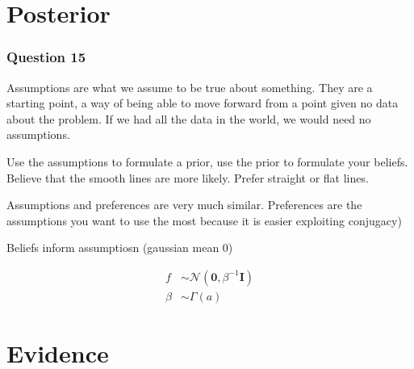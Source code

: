 \documentclass[10pt, a4paper, twocolumn]{article} %
\begin{document}
\section{Posterior}

\subsubsection*{Question 15}

Assumptions are what we assume to be true about something. They are a starting point, a way of being able to move forward from a point given no data about the problem. If we had all the data in the world, we would need no assumptions.

Use the assumptions to formulate a prior, use the prior to formulate your beliefs. Believe that the smooth lines are more likely. Prefer straight or flat lines.

Assumptions and preferences are very much similar. Preferences are the assumptions you want to use the most because it is easier exploiting conjugacy)

Beliefs inform assumptiosn (gaussian mean 0)

\begin{align}
  f &\sim \mathcal{N}\left(\boldsymbol{0},\beta^{-1}\mathbf{I}\right)\\
  \beta &\sim \Gamma(a)
\end{align}

\section{Evidence}


\printbibliography[title={Bibliography}] %

\end{document}
